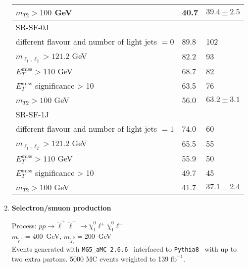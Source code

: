 \documentclass[10pt,fleqn]{article}
\newcommand{\ifb}{$\mathrm{fb}^{-1}$}
\begin{document}
\begin{enumerate}
\begin{table}[h!]
\begin{tabular}{l|p{1.5cm}|p{1.5cm}}
  $m_{T2} >  100$ GeV                                                             &  40.7    &    $39.4\pm 2.5$\\ \midrule     
  SR-SF-0J  & &\\ \midrule
  different flavour and number of light jets $=0$                                 &  89.8    &   102\\
  $m_{\ell_1,\ell_2} > 121.2  $ GeV                                               &  82.2    &    93\\
  $E_T^\mathrm{miss} > 110$ GeV                                                   &  68.7    &    82\\
  $E_T^\mathrm{miss}$ significance > 10                                           &  63.5    &    76\\
  $m_{T2} >  100$ GeV                                                             &  56.0    &    $63.2 \pm 3.1$ \\ \midrule     
  SR-SF-1J  & &\\ \midrule
  different flavour and number of light jets $=1$                                 &  74.0    &    60\\
  $m_{\ell_1,\ell_2} > 121.2  $ GeV                                               &  65.5    &    55\\
  $E_T^\mathrm{miss} > 110$ GeV                                                   &  55.9    &    50\\
  $E_T^\mathrm{miss}$ significance > 10                                           &  49.7    &    45\\
  $m_{T2} >  100$ GeV                                                             &  41.7    &    $37.1 \pm 2.4$\\ \bottomrule
 \end{tabular}
\end{table}  
 
\newpage 
 
\item{\bf Selectron/smuon production}

 Process: $ p p \to \tilde{\ell}^+ \tilde{\ell}^- \to \tilde{\chi}^0_1 \ell^+ \tilde{\chi}^0_1 \ell^-$\\
 $m_{\tilde{\ell}^\pm} = 400$~GeV, $m_{\tilde{\chi}_1^0} = 200$~GeV\\
 Events generated with \texttt{MG5\_aMC 2.6.6}~\cite{Alwall:2014hca} interfaced to \texttt{Pythia8}~\cite{Sjostrand:2007gs} with up to two extra partons.
 5000 MC events weighted to 139 \ifb. 
 

\end{enumerate}
\end{document}
